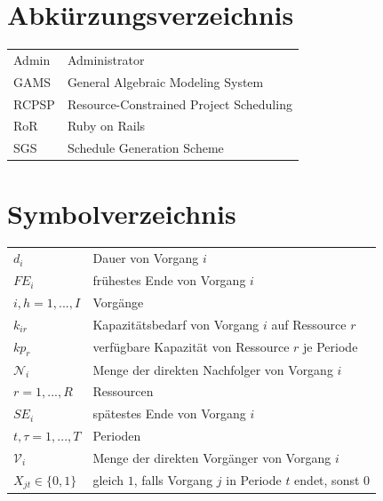 \documentclass[a4paper,12pt,parskip,bibtotoc,liststotoc]{article}
\begin{document}
\newpage
\section*{Abkürzungsverzeichnis}
\begin{table}[h!]
    \vspace*{-3mm}
    \hspace*{2mm}
  \renewcommand{\arraystretch}{1,5}
    \begin{tabular}{ll}  %
	Admin & Administrator \\         
	GAMS & General Algebraic Modeling System\\
	RCPSP      & Resource-Constrained Project Scheduling \\
           RoR & Ruby on Rails \\
SGS & Schedule Generation Scheme\\
	\end{tabular}
\end{table}
\newpage
\section*{Symbolverzeichnis}
\begin{table}[h!]
    \vspace*{-3mm}
        \hspace*{2mm}
      \renewcommand{\arraystretch}{1,5}
    \begin{tabular}{ll} 
$d_i$ & Dauer von Vorgang $i$ \\
$FE_i$& frühestes Ende von Vorgang $i$\\
$i,h=1,...,I$ & Vorgänge \\
$k_{ir}$& Kapazitätsbedarf von Vorgang $i$ auf Ressource $r$\\
$kp_r$ & verfügbare Kapazität von Ressource $r$ je Periode\\
$\mathcal{N}_i$ & Menge der direkten Nachfolger von Vorgang $i$ \\
$r=1,...,R$ & Ressourcen \\
$SE_i$& spätestes Ende von Vorgang $i$\\
$t,\tau=1,..., T$ & Perioden\\
$\mathcal{V}_i$ & Menge der direkten Vorgänger von Vorgang $i$ \\
$X_{jt}\in\{0,1\}$ & gleich $1$, falls Vorgang $j$ in Periode $t$ endet, sonst $0$
  	\end{tabular}
\end{table}
\newpage
{}   %
\end{document}
